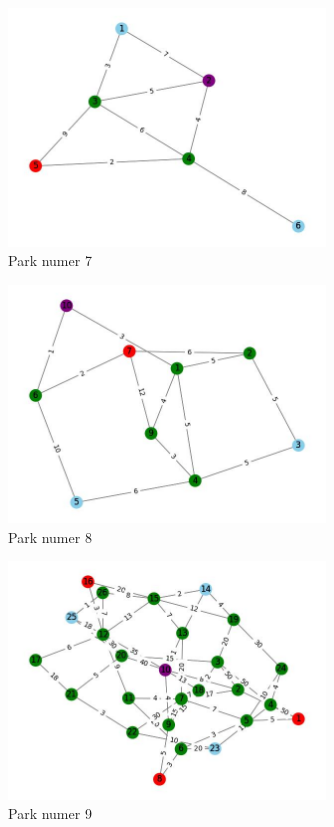 \documentclass{article}
\begin{document}
\begin{figure}[h!]
\centering
\includegraphics[width=0.75\textwidth]{7.jpg}
\caption{Park numer 7}
\end{figure}
\begin{figure}[h!]
\centering
\includegraphics[width=0.75\textwidth]{8.jpg}
\caption{Park numer 8}
\end{figure}
\begin{figure}[h!]
\centering
\includegraphics[width=0.75\textwidth]{9.jpg}
\caption{Park numer 9}
\end{figure}
\end{document}
